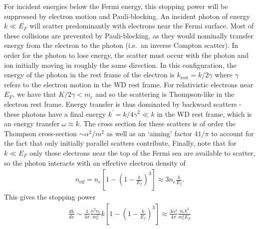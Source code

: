\documentclass[twocolumn, preprintnumbers,amsmath,amssymb,prd, superscriptaddress]{revtex4}
\begin{document}
\begin{appendices}
For incident energies below the Fermi energy, this stopping power will be suppressed by electron motion and Pauli-blocking. 
An incident photon of energy $k \ll E_F$ will scatter predominantly with electrons near the Fermi surface.
Most of these collisions are prevented by Pauli-blocking, as they would nominally transfer energy from the electron to the photon (i.e.~an inverse Compton scatter). 
In order for the photon to lose energy, the scatter must occur with the photon and ion initially moving in roughly the same direction.  
In this configuration, the energy of the photon in the rest frame of the electron is $k_\text{rest} = k/2\gamma$ where $\gamma$ refers to the electron motion in the WD rest frame. 
For relativistic electrons near $E_F$, we have that $K/2\gamma < m_e$ and so the scattering is Thompson-like in the electron rest frame. 
Energy transfer is thus dominated by backward scatters - these photons have a final energy $k^\prime = k/4\gamma^2 \ll k$ in the WD rest frame, which is an energy transfer $\omega \approx k$. 
The cross section for these scatters is of order the Thompson cross-section $\sim \alpha^2/m^2$ as well as an `aiming' factor $41/\pi$ to account for the fact that only initially parallel scatters contribute. 
Finally, note that for $k \ll E_F$ only those electrons near the top of the Fermi sea are available to scatter, so the photon interacts with an effective electron density of 
\begin{align}
    n_\text{eff} = n_e \left[ 1 - \left(1 - \frac{k}{E_f} \right)^3\right]
    \approx 3 n_e \frac{k}{E_f}.
\end{align}
This gives the stopping power 
\begin{align}
  \frac{dk}{dx} \sim \frac{1}{4\pi} \frac{\alpha^2 n_e}{m_e^2} 
  k \left[ 1 - \left(1 - \frac{k}{E_f} \right)^3\right]
  \approx \frac{3\alpha^2}{4\pi} \frac{n_e k^2}{m_e^2 E_F} 
\end{align}


\end{appendices}
\end{document}
